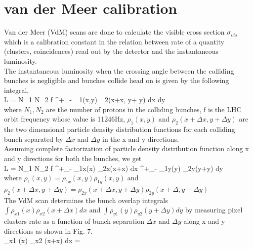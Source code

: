 \newpage \section{van der Meer calibration}
\label{sec:vdm}
Van der Meer (VdM) scans are done to calculate the visible cross section $\sigma_{vis}$ which is a calibration constant in the relation between rate of a quantity (clusters, coincidences) read out by the detector and the instantaneous luminosity. \\

The instantaneous luminosity when the crossing angle between the colliding bunches is negligible and bunches collide head on is given by the following integral, \cite{CMS-PAS-LUM-13-001} \\

L = N_1 N_2 f \int^{+\infty}_{-\infty} \rho_1(x,y) \rho_2(x+\Delta x, y+ \Delta y) dx dy \\

where $N_1, N_2$ are the number of protons in the colliding bunches, f is the LHC orbit frequency whose value is 11246Hz,  $\rho_1(x,y)$ and $\rho_2(x+\Delta x,y+\Delta y)$ are the two dimensional particle density distribution functions for each colliding bunch separated by $\Delta x$ and $\Delta y$ in the x and y directions. \\

Assuming complete factorization of particle density distribution function along x and y directions for both the bunches, we get \\

L = N_1 N_2 f \int^{+\infty}_{-\infty} \rho_{1x}(x) \rho_{2x}(x+\Delta x)  dx   \int^{+\infty}_{-\infty} \rho_{1y}(y) \rho_{2y}(y+\Delta y)  dy \\

where $\rho_1(x,y) = \rho_{1x}(x,y) \rho_{1y} (x,y)$ and $\rho_2(x+\Delta x,y + \Delta y) = \rho_{2x}(x+\Delta x,y+\Delta y) \rho_{2y} (x+\Delta,y+\Delta y)$ \\

The VdM scan determines the bunch  overlap integrals $\int \rho_{x1} (x) \rho_{x2} (x+\Delta x) dx$ and  $\int \rho_{y1}(y) \rho_{y2} (y+\Delta y) dy$ by measuring pixel clusters rate as a function of bunch separation $\Delta x$ and $\Delta y$ along x and y directions as shown in Fig. 7. \\

\int \rho_{x1} (x) \rho_{x2} (x+\Delta x) dx =  \\

